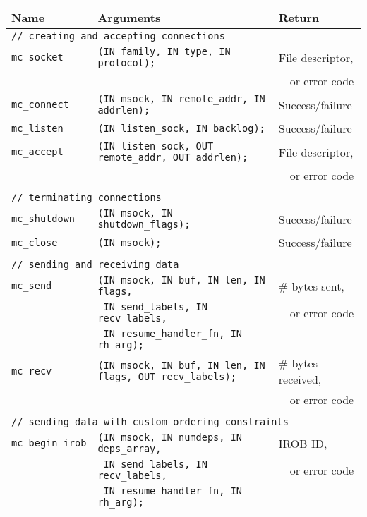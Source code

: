 \documentclass[10pt]{article}
\begin{document}
\begin{figure*}[t]
\begin{small}
\begin{center}
\begin{tabular}{|lll|} \hline
{\bf Name} & {\bf Arguments} & {\bf Return} \\
\hline
\multicolumn{3}{|l|}{\tt // creating and accepting connections} \\
{\tt mc\_socket} & {\tt (IN family, IN type, IN protocol);} & File descriptor,\\
& & ~~or error code\\
{\tt mc\_connect} & {\tt (IN msock, IN remote\_addr, IN addrlen); } & Success/failure\\
{\tt mc\_listen} & {\tt (IN listen\_sock, IN backlog); } & Success/failure\\
{\tt mc\_accept} & {\tt (IN listen\_sock, OUT remote\_addr, OUT addrlen); } & File descriptor,\\
& & ~~or error code\\
& & \\
\multicolumn{3}{|l|}{\tt // terminating connections} \\
{\tt mc\_shutdown} & {\tt (IN msock, IN shutdown\_flags);} & Success/failure\\
{\tt mc\_close} & {\tt (IN msock);} & Success/failure\\
& & \\
\multicolumn{3}{|l|}{\tt // sending and receiving data} \\
{\tt mc\_send} & {\tt (IN msock, IN buf, IN len, IN flags, }& \# bytes sent,\\
               & {\tt ~IN send\_labels, IN recv\_labels,}& ~~or error code\\
               & {\tt ~IN resume\_handler\_fn, IN rh\_arg); } & \\
{\tt mc\_recv} & {\tt (IN msock, IN buf, IN len, IN flags, OUT recv\_labels);}& \# bytes received,\\
 & & ~~or error code\\
 & & \\
\multicolumn{3}{|l|}{\tt // sending data with custom ordering constraints} \\
{\tt mc\_begin\_irob} & {\tt (IN msock, IN numdeps, IN deps\_array,}& IROB ID, \\
                      & {\tt ~IN send\_labels, IN recv\_labels,}& ~~or error code\\ 
                      & {\tt ~IN resume\_handler\_fn, IN rh\_arg); } & \\

\end{tabular}
\end{center}
\end{small}
\end{figure*}
\end{document}
